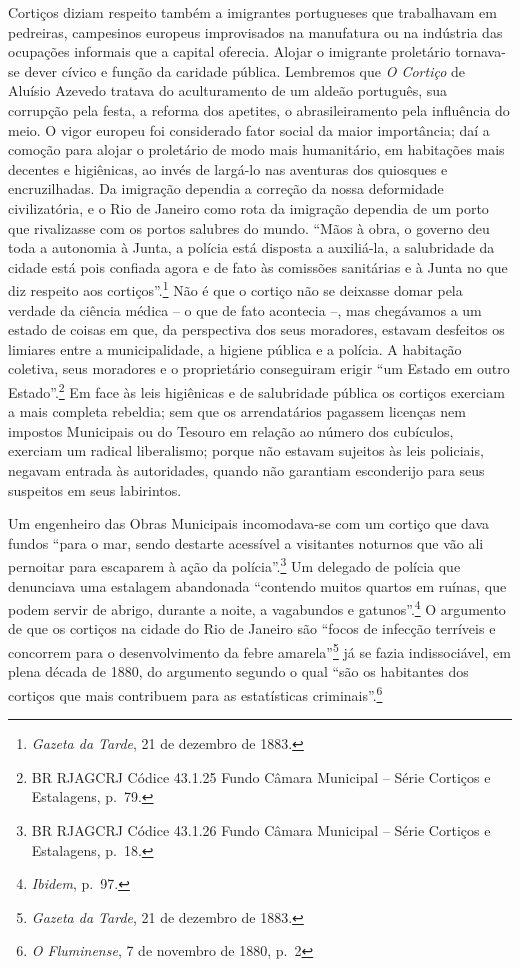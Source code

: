Cortiços diziam respeito também a imigrantes portugueses que trabalhavam
em pedreiras, campesinos europeus improvisados na manufatura ou na
indústria das ocupações informais que a capital oferecia. Alojar o
imigrante proletário tornava-se dever cívico e função da caridade
pública. Lembremos que \emph{O Cortiço} de Aluísio Azevedo tratava do
aculturamento de um aldeão português, sua corrupção pela festa, a
reforma dos apetites, o abrasileiramento pela influência do meio. O
vigor europeu foi considerado fator social da maior importância; daí a
comoção para alojar o proletário de modo mais humanitário, em habitações
mais decentes e higiênicas, ao invés de largá-lo nas aventuras dos
quiosques e encruzilhadas. Da imigração dependia a correção da nossa
deformidade civilizatória, e o Rio de Janeiro como rota da imigração
dependia de um porto que rivalizasse com os portos salubres do mundo.
``Mãos à obra, o governo deu toda a autonomia à Junta, a polícia está
disposta a auxiliá-la, a salubridade da cidade está pois confiada agora
e de fato às comissões sanitárias e à Junta no que diz respeito aos
cortiços''.\footnote{\emph{Gazeta da Tarde}, 21 de dezembro de 1883.}
Não é que o cortiço não se deixasse domar pela verdade da ciência médica
-- o que de fato acontecia --, mas chegávamos a um estado de coisas em
que, da perspectiva dos seus moradores, estavam desfeitos os limiares
entre a municipalidade, a higiene pública e a polícia. A habitação
coletiva, seus moradores e o proprietário conseguiram erigir ``um Estado
em outro Estado''.\footnote{BR RJAGCRJ Códice 43.1.25 Fundo Câmara
  Municipal -- Série Cortiços e Estalagens, p.~79.} Em face às leis
higiênicas e de salubridade pública os cortiços exerciam a mais completa
rebeldia; sem que os arrendatários pagassem licenças nem impostos
Municipais ou do Tesouro em relação ao número dos cubículos, exerciam um
radical liberalismo; porque não estavam sujeitos às leis policiais,
negavam entrada às autoridades, quando não garantiam esconderijo para
seus suspeitos em seus labirintos.

Um engenheiro das Obras Municipais incomodava-se com um cortiço que dava
fundos ``para o mar, sendo destarte acessível a visitantes noturnos que
vão ali pernoitar para escaparem à ação da polícia''.\footnote{BR
  RJAGCRJ Códice 43.1.26 Fundo Câmara Municipal -- Série Cortiços e
  Estalagens, p.~18.} Um delegado de polícia que denunciava uma
estalagem abandonada ``contendo muitos quartos em ruínas, que podem
servir de abrigo, durante a noite, a vagabundos e gatunos''.\footnote{\emph{Ibidem},
  p.~97.} O argumento de que os cortiços na cidade do Rio de Janeiro são
``focos de infecção terríveis e concorrem para o desenvolvimento da
febre amarela''\footnote{\emph{Gazeta da Tarde}, 21 de dezembro de 1883.}
já se fazia indissociável, em plena década de 1880, do argumento segundo
o qual ``são os habitantes dos cortiços que mais contribuem para as
estatísticas criminais''.\footnote{\emph{O Fluminense}, 7 de novembro de
  1880, p.~2}

